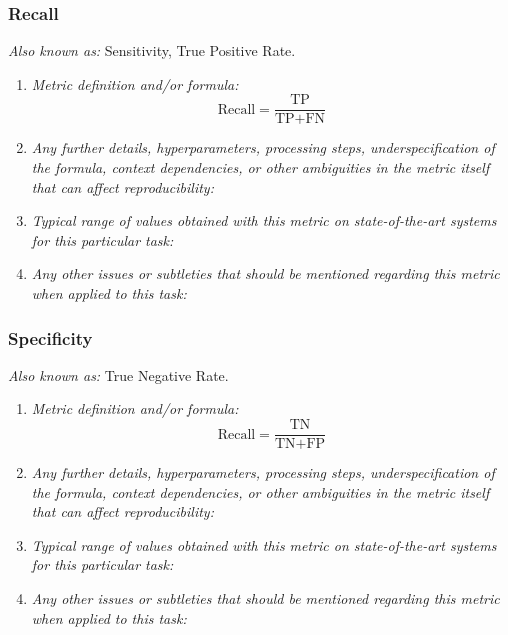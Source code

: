 \documentclass[a4paper,11pt]{article}
\begin{document}
        \subsubsection{Recall}
            \textit{Also known as:} Sensitivity, True Positive Rate.
            \begin{enumerate}[label=\alph*.]
                \item \textit{Metric definition and/or formula:}
                    \begin{equation}
                        \textrm{Recall} = \frac{\textrm{TP}}{\textrm{TP} + \textrm{FN}}
                    \end{equation}
                \bigskip
                \item \textit{Any further details, hyperparameters, processing steps, underspecification of the formula, context dependencies, or other ambiguities in the metric itself that can affect reproducibility:}
                \bigskip
                \item \textit{Typical range of values obtained with this metric on state-of-the-art systems for this particular task:}
                \bigskip
                \item \textit{Any other issues or subtleties that should be mentioned regarding this metric when applied to this task:}
                \bigskip
            \end{enumerate}
        \subsubsection{Specificity}
            \textit{Also known as:} True Negative Rate.
            \begin{enumerate}[label=\alph*.]
                \item \textit{Metric definition and/or formula:}
                    \begin{equation}
                        \textrm{Recall} = \frac{\textrm{TN}}{\textrm{TN} + \textrm{FP}}
                    \end{equation}
                \bigskip
                \item \textit{Any further details, hyperparameters, processing steps, underspecification of the formula, context dependencies, or other ambiguities in the metric itself that can affect reproducibility:}
                \bigskip
                \item \textit{Typical range of values obtained with this metric on state-of-the-art systems for this particular task:}
                \bigskip
                \item \textit{Any other issues or subtleties that should be mentioned regarding this metric when applied to this task:}
                \bigskip
            \end{enumerate}
\end{document}
